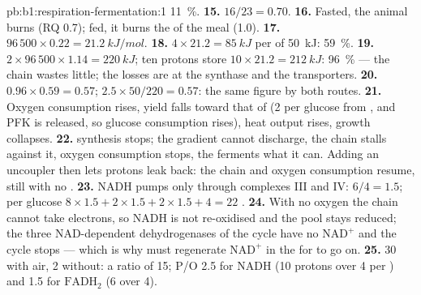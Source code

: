 \begin{solution}{pb:b1:respiration-fermentation:1}
\qty{11}{\%}.
\textbf{15.} $16/23 = 0.70$.
\textbf{16.} Fasted, the animal burns  (RQ 0.7); fed, it burns the
 of the meal (1.0).
\textbf{17.} $96\,500\times 0.22 = \qty{21.2}{kJ/mol}$.
\textbf{18.} $4\times 21.2 = \qty{85}{kJ}$ per  of \qty{50}{kJ}:
\qty{59}{\%}.
\textbf{19.} $2\times 96\,500\times 1.14 = \qty{220}{kJ}$; ten protons
store $10\times 21.2 = \qty{212}{kJ}$: \qty{96}{\%} --- the chain wastes
little; the losses are at the synthase and the transporters.
\textbf{20.} $0.96\times 0.59 = 0.57$; $2.5\times 50/220 = 0.57$: the
same figure by both routes.
\textbf{21.} Oxygen consumption rises,  yield falls toward that of
 (2 per glucose from , and PFK is released, so
glucose consumption rises), heat output rises, growth collapses.
\textbf{22.}  synthesis stops; the gradient cannot discharge, the
chain stalls against it, oxygen consumption stops, the  ferments
what it can. Adding an uncoupler then lets protons leak back: the chain
and oxygen consumption resume, still with no .
\textbf{23.} NADH pumps only through complexes III and IV: $6/4 = 1.5$;
per glucose $8\times 1.5 + 2\times 1.5 + 2\times 1.5 + 4 = 22$ .
\textbf{24.} With no oxygen the chain cannot take electrons, so NADH
is not re-oxidised and the pool stays reduced; the three
NAD-dependent dehydrogenases of the cycle have no $\mathrm{NAD^+}$ and
the cycle stops --- which is why  must regenerate
$\mathrm{NAD^+}$ in the  for  to go on.
\textbf{25.} 30  with air, 2 without: a ratio of 15; P/O 2.5 for
NADH (10 protons over 4 per ) and 1.5 for $\mathrm{FADH_2}$ (6 over
4).
\end{solution}
